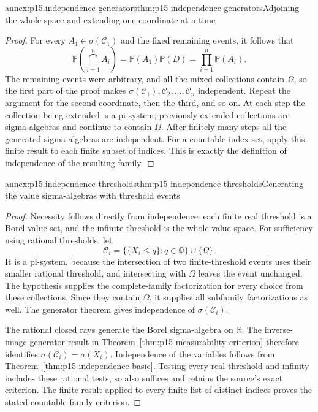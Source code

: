 \begin{annexitem}{annex:p15.independence-generators}{thm:p15-independence-generators}{Adjoining the whole space and extending one coordinate at a time}
\begin{proof}
For every \(A_1\in\sigma(\mathcal C_1)\) and the fixed remaining
events, it follows that
\[
 \mathbb P\left(\bigcap_{i=1}^n A_i\right)
       =\mathbb P(A_1)\mathbb P(D)
       =\prod_{i=1}^n\mathbb P(A_i).
\]
The remaining events were arbitrary, and all the mixed collections
contain \(\Omega\), so the first part of the proof makes
\(\sigma(\mathcal C_1),\mathcal C_2,\ldots,\mathcal C_n\)
independent. Repeat the argument for the second coordinate, then the
third, and so on. At each step the collection being extended is a
pi-system; previously extended collections are sigma-algebras and
continue to contain \(\Omega\). After finitely many steps all
the generated sigma-algebras are independent. For a countable index
set, apply this finite result to each finite subset of indices.
This is exactly the definition of independence of the resulting family.
\end{proof}
\end{annexitem}

\begin{annexitem}{annex:p15.independence-thresholds}{thm:p15-independence-thresholds}{Generating the value sigma-algebras with threshold events}
\begin{proof}
Necessity follows directly from independence: each finite real
threshold is a Borel value set, and the infinite threshold is the
whole value space. For sufficiency using rational thresholds, let
\[
 \mathcal C_i=\{\{X_i\leq q\}:q\in\mathbb Q\}\cup\{\Omega\}.
\]
It is a pi-system, because the intersection of two finite-threshold
events uses their smaller rational threshold, and intersecting with
\(\Omega\) leaves the event unchanged. The hypothesis supplies
the complete-family factorization for every choice from these
collections. Since they contain \(\Omega\), it supplies all
subfamily factorizations as well. The generator theorem gives
independence of \(\sigma(\mathcal C_i)\).

The rational closed rays generate the Borel sigma-algebra on
\(\mathbb R\). The inverse-image generator result in
Theorem~\ref{thm:p15-measurability-criterion} therefore identifies
\(\sigma(\mathcal C_i)=\sigma(X_i)\). Independence of the
variables follows from Theorem~\ref{thm:p15-independence-basic}.
Testing every real threshold and infinity includes these rational
tests, so also suffices and retains the source's exact criterion.
The finite result applied to every finite list of distinct indices
proves the stated countable-family criterion.
\end{proof}
\end{annexitem}

